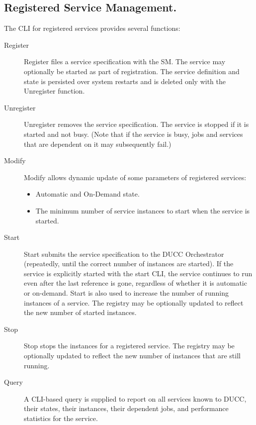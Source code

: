     \subsection{Registered Service Management.} The CLI for registered services provides several functions:

    \begin{description}
        \item[Register] Register files a service specification with the SM. The service may optionally
          be started as part of registration. The service definition and state is persisted over system
          restarts and is deleted only with the Unregister function.
          
        \item[Unregister] Unregister removes the service specification. The service is stopped if it is
          started and not busy. (Note that if the service is busy, jobs and services that are dependent
          on it may subsequently fail.)
          
        \item[Modify] Modify allows dynamic update of some parameters of registered services:
            \begin{itemize}
              \item Automatic and On-Demand state.
              \item The minimum number of service instances to start when the service is started.  
            \end{itemize}

        \item[Start] Start submits the service specification to the DUCC Orchestrator (repeatedly,
          until the correct number of instances are started). If the service is explicitly started
          with the start CLI, the service continues to run even after the last reference is gone,
          regardless of whether it is automatic or on-demand. Start is also used to increase the
          number of running instances of a service. The registry may be optionally updated to
          reflect the new number of started instances.
          
        \item[Stop] Stop stops the instances for a registered service. The registry may be
          optionally updated to reflect the new number of instances that are still running.

        \item[Query] A CLI-based query is supplied to report on all services known to DUCC, their
          states, their instances, their dependent jobs, and performance statistics for the service.
    \end{description}
        
